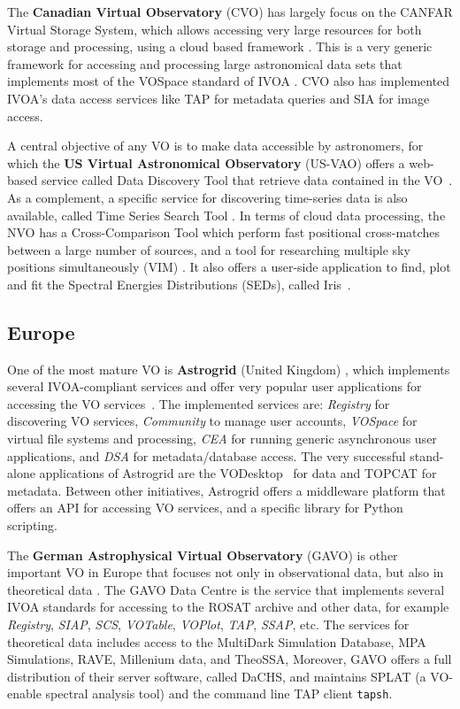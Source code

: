The \textbf{Canadian Virtual Observatory} (CVO) has largely focus on the CANFAR Virtual Storage
System, which
allows accessing very large resources for both storage and processing, 
using a cloud based framework \cite{Gaudet2011}. 
This is a very generic framework for accessing and processing 
large astronomical data sets that implements most of the
VOSpace standard of IVOA \cite{Graham2007a}. CVO also has implemented
IVOA's data access services like TAP for metadata queries 
and SIA for image access.

A central objective of any VO is to make data accessible by astronomers,
for which the \textbf{US Virtual Astronomical Observatory} (US-VAO) 
offers a web-based service called Data Discovery Tool 
that retrieve data contained in the VO~\cite{McGlynn2013}. 
As a complement, a specific service for discovering time-series data
is also available, called Time Series Search Tool \cite{Graham2012}.
In terms of cloud data processing, the NVO has a Cross-Comparison Tool 
which perform fast positional cross-matches between a large number of 
sources, and a tool for researching multiple sky positions simultaneously (VIM)
\cite{Hanisch2012}.
It also offers a user-side application to find, plot and fit the
Spectral Energies Distributions (SEDs), called Iris~\cite{Laurino2013}.

\subsection{Europe}

One of the most mature VO is \textbf{Astrogrid} (United Kingdom)
\cite{Lawrence2002}, which implements
several IVOA-compliant services and offer very popular user applications
for accessing the VO services~\cite{Lawence2009}.
The implemented services are: \emph{Registry}
for discovering VO services, \emph{Community} to manage user accounts, 
\emph{VOSpace} for virtual file systems and processing, \emph{CEA} for running
generic asynchronous user applications, and \emph{DSA} for metadata/database
access. The very successful stand-alone applications of Astrogrid are 
the VODesktop~\cite{Tedds2008} for data and
TOPCAT \cite{Graham2007} for metadata.
Between other initiatives, Astrogrid offers a middleware platform 
that offers an API for accessing VO services, and a specific 
library for Python scripting.

The \textbf{German Astrophysical Virtual Observatory} (GAVO) is other important VO in Europe that focuses not
only in observational data, but also in theoretical data \cite{Lemson2007}.
The GAVO Data Centre is the service that implements several IVOA standards for 
accessing to the ROSAT archive and other data, for example 
\emph{Registry}, \emph{SIAP}, \emph{SCS}, \emph{VOTable}, \emph{VOPlot}, 
\emph{TAP}, \emph{SSAP}, etc. The services for 
theoretical data includes access to the MultiDark Simulation Database, %
MPA Simulations, %
RAVE, %
Millenium data, %
and TheoSSA, %
Moreover, GAVO offers a full distribution of their server software, called
DaCHS, and maintains SPLAT (a VO-enable spectral analysis tool) and the command line TAP
client \texttt{tapsh}.


